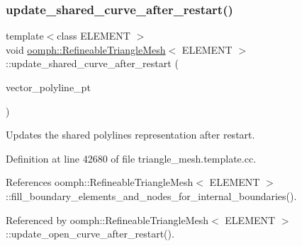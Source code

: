 \subsubsection{\texorpdfstring{update\+\_\+shared\+\_\+curve\+\_\+after\+\_\+restart()}{update\_shared\_curve\_after\_restart()}}
{\footnotesize\ttfamily template$<$class E\+L\+E\+M\+E\+NT $>$ \\
void \hyperlink{classoomph_1_1RefineableTriangleMesh}{oomph\+::\+Refineable\+Triangle\+Mesh}$<$ E\+L\+E\+M\+E\+NT $>$\+::update\+\_\+shared\+\_\+curve\+\_\+after\+\_\+restart (\begin{DoxyParamCaption}\item[{Vector$<$ Triangle\+Mesh\+Poly\+Line $\ast$$>$ \&}]{vector\+\_\+polyline\+\_\+pt }\end{DoxyParamCaption})\hspace{0.3cm}{\ttfamily [protected]}}



Updates the shared polylines representation after restart. 



Definition at line 42680 of file triangle\+\_\+mesh.\+template.\+cc.



References oomph\+::\+Refineable\+Triangle\+Mesh$<$ E\+L\+E\+M\+E\+N\+T $>$\+::fill\+\_\+boundary\+\_\+elements\+\_\+and\+\_\+nodes\+\_\+for\+\_\+internal\+\_\+boundaries().



Referenced by oomph\+::\+Refineable\+Triangle\+Mesh$<$ E\+L\+E\+M\+E\+N\+T $>$\+::update\+\_\+open\+\_\+curve\+\_\+after\+\_\+restart().

\mbox{\label{classoomph_1_1RefineableTriangleMesh_abf6df1f560c8559467673c45a5b26e2e}} 
